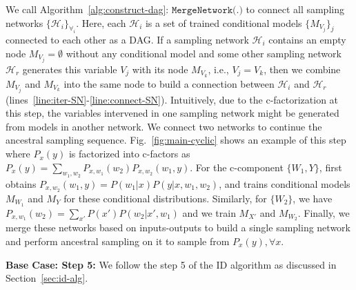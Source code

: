 \documentclass{article}
\newcommand{\h}{\mathcal{H}}
\newcommand{\idgen}{\text{ID-GEN}\xspace}
\newcommand{\idmerge}{\texttt{MergeNetwork(.)}\xspace}
\theoremstyle{plain}
\theoremstyle{definition}
\theoremstyle{remark}
\begin{document}
We call Algorithm~\ref{alg:construct-dag}: ${\idmerge}$ to connect all sampling networks {$\{\h_i\}_{\forall_i}$}. Here, each $\h_i$ is a set of trained conditional models $\{M_{V_j}\}_j$ connected to each other as a DAG. If a sampling network $\h_i$ contains an empty node $M_{V_j}=\emptyset$ without any conditional model and some other sampling network $\h_r$ generates this variable $V_j$ with its node $M_{V_k}$, i.e., $V_j=V_k$, then we combine $M_{V_j}$ and $M_{V_k}$ into the same node to build a connection between $\h_i$ and $\h_r$ (lines~\ref{line:iter-SN}-\ref{line:connect-SN}).
Intuitively, due to the c-factorization at this step, the variables intervened in one sampling network might be generated from models in another network. We connect two networks to continue the ancestral sampling sequence.
%
Fig.~\ref{fig:main-cyclic} shows an example of this step where $P_{x}(y)$ is factorized into c-factors as $ P_{x}(y)= \sum_{w_1,w_2} P_{x,w_1}(w_2)  P_{x,w_2}(w_1,y)$.
%
%
For the c-component $\{W_1,Y\}$, \idgen first obtains $P_{x,w_2}(w_1,y) = P(w_1|x)P(y|x,w_1,w_2)$, and trains conditional models $M_{W_1}$ and $M_{Y}$ for these conditional distributions. 
%
Similarly, for $\{W_2\}$, we have $P_{x, w_1}(w_2) = \sum_{x'}P(x')P(w_2|x', w_1)$ and we train $M_{X'}$ and $M_{W_2}$.
Finally, we merge these networks based on inputs-outputs to build a single sampling network and perform ancestral sampling on it to sample from $P_{x}(y), \forall x$.
%
%
%
%
%
\par
\textbf{Base Case: Step 5:}
We follow the step 5 of the ID algorithm as discussed in Section~\ref{sec:id-alg}.
%
\end{document}

